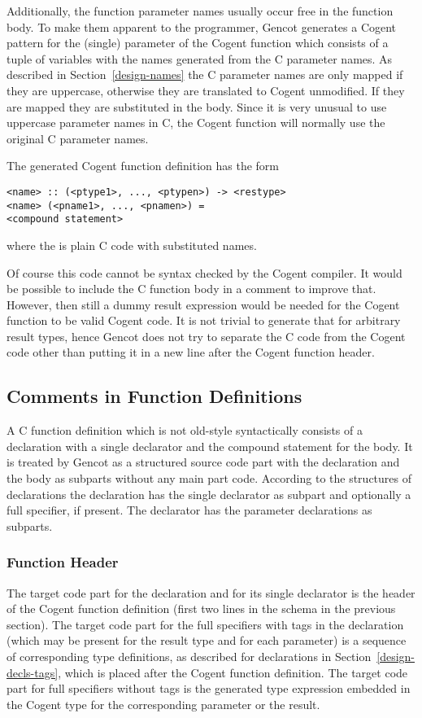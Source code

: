 Additionally, the function parameter names usually occur free in the function body. To make them apparent to
the programmer, Gencot generates a Cogent pattern for the (single) parameter of the Cogent function which 
consists of a tuple of variables with the names generated from the C parameter names. As described in 
Section~\ref{design-names} the C parameter names are only mapped if they are uppercase, otherwise they are
translated to Cogent unmodified. If they are mapped they are substituted in the body. Since it is very unusual
to use uppercase parameter names in C, the Cogent function will normally use the original C parameter names.

The generated Cogent function definition has the form
\begin{verbatim}
<name> :: (<ptype1>, ..., <ptypen>) -> <restype>
<name> (<pname1>, ..., <pnamen>) =
<compound statement>
\end{verbatim}
where the  is plain C code with substituted names.

Of course this code cannot be syntax checked by the Cogent compiler. 
It would be possible to include the C function body in a comment to improve that. However, then
still a dummy result expression would be needed for the Cogent function to be valid Cogent code.
It is not trivial to generate that for arbitrary result types, hence Gencot does not try
to separate the C code from the Cogent code other than putting it in a new line after the 
Cogent function header.

\subsection{Comments in Function Definitions}

A C function definition which is not old-style syntactically consists of a declaration with a single declarator
and the compound statement for the body.
It is treated by Gencot as a structured source code part with the declaration and the body as subparts
without any main part code. According to the structures of declarations the declaration has the single declarator as subpart
and optionally a full specifier, if present. The declarator has the parameter declarations as subparts.

\subsubsection{Function Header}

The target code part for the declaration and for its single declarator is the header of the Cogent function definition
(first two lines in the schema in the previous section). The target code part for the full specifiers with tags in
the declaration (which may be present for the result type and for each parameter) is a sequence of corresponding 
type definitions, as described for declarations in Section~\ref{design-decls-tags}, which is placed 
after the Cogent function definition. The target code part for full specifiers without tags is the generated type
expression embedded in the Cogent type for the corresponding parameter or the result.

